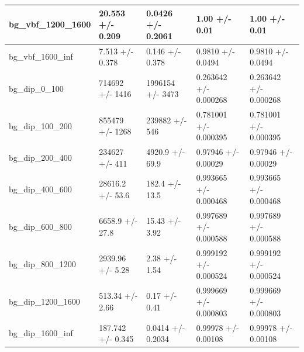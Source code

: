 \documentclass[a4paper, 10pt]{article}
\begin{document}
\begin{table}[H]
\begin{center}
\begin{tabular}{|m{20.0mm}|m{27.0mm}|m{27.0mm}|m{33.0mm}|m{32.0mm}|}
      \hline
      {\cellcolor{white}         bg\_vbf\_1200\_1600}& {\cellcolor{white}         20.553 +/\-- 0.209}& {\cellcolor{white}         0.0426 +/\-- 0.2061}& {\cellcolor{white}         1.00 +/\-- 0.01}& {\cellcolor{white}         1.00 +/\-- 0.01}\\
      \hline
      {\cellcolor{white}         bg\_vbf\_1600\_inf}& {\cellcolor{white}         7.513 +/\-- 0.378}& {\cellcolor{white}         0.146 +/\-- 0.378}& {\cellcolor{white}         0.9810 +/\-- 0.0494}& {\cellcolor{white}         0.9810 +/\-- 0.0494}\\
      \hline
      {\cellcolor{white}         bg\_dip\_0\_100}& {\cellcolor{white}         714692 +/\-- 1416}& {\cellcolor{white}         1996154 +/\-- 3473}& {\cellcolor{white}         0.263642 +/\-- 0.000268}& {\cellcolor{white}         0.263642 +/\-- 0.000268}\\
      \hline
      {\cellcolor{white}         bg\_dip\_100\_200}& {\cellcolor{white}         855479 +/\-- 1268}& {\cellcolor{white}         239882 +/\-- 546}& {\cellcolor{white}         0.781001 +/\-- 0.000395}& {\cellcolor{white}         0.781001 +/\-- 0.000395}\\
      \hline
      {\cellcolor{white}         bg\_dip\_200\_400}& {\cellcolor{white}         234627 +/\-- 411}& {\cellcolor{white}         4920.9 +/\-- 69.9}& {\cellcolor{white}         0.97946 +/\-- 0.00029}& {\cellcolor{white}         0.97946 +/\-- 0.00029}\\
      \hline
      {\cellcolor{white}         bg\_dip\_400\_600}& {\cellcolor{white}         28616.2 +/\-- 53.6}& {\cellcolor{white}         182.4 +/\-- 13.5}& {\cellcolor{white}         0.993665 +/\-- 0.000468}& {\cellcolor{white}         0.993665 +/\-- 0.000468}\\
      \hline
      {\cellcolor{white}         bg\_dip\_600\_800}& {\cellcolor{white}         6658.9 +/\-- 27.8}& {\cellcolor{white}         15.43 +/\-- 3.92}& {\cellcolor{white}         0.997689 +/\-- 0.000588}& {\cellcolor{white}         0.997689 +/\-- 0.000588}\\
      \hline
      {\cellcolor{white}         bg\_dip\_800\_1200}& {\cellcolor{white}         2939.96 +/\-- 5.28}& {\cellcolor{white}         2.38 +/\-- 1.54}& {\cellcolor{white}         0.999192 +/\-- 0.000524}& {\cellcolor{white}         0.999192 +/\-- 0.000524}\\
      \hline
      {\cellcolor{white}         bg\_dip\_1200\_1600}& {\cellcolor{white}         513.34 +/\-- 2.66}& {\cellcolor{white}         0.17 +/\-- 0.41}& {\cellcolor{white}         0.999669 +/\-- 0.000803}& {\cellcolor{white}         0.999669 +/\-- 0.000803}\\
      \hline
      {\cellcolor{white}         bg\_dip\_1600\_inf}& {\cellcolor{white}         187.742 +/\-- 0.345}& {\cellcolor{white}         0.0414 +/\-- 0.2034}& {\cellcolor{white}         0.99978 +/\-- 0.00108}& {\cellcolor{white}         0.99978 +/\-- 0.00108}\\
\hline
    \end{tabular}
  \end{center}
\end{table}
\end{document}
